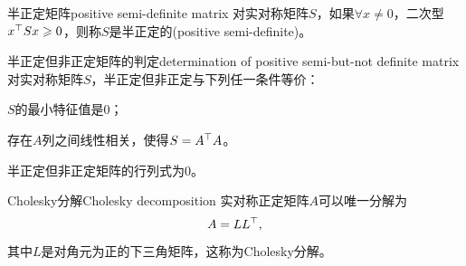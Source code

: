 \begin{definition}{半正定矩阵}{positive semi-definite matrix}
	对实对称矩阵$S$，如果$\forall x \neq 0$，二次型$x^\top Sx \geqslant 0$，则称$S$是半正定的(positive semi-definite)。
\end{definition}
\begin{theorem}{半正定但非正定矩阵的判定}{determination of positive semi-but-not definite matrix}
	对实对称矩阵$S$，半正定但非正定与下列任一条件等价：
	\begin{compactenum}
		\item $S$的最小特征值是0；
		\item 存在$A$列之间线性相关，使得$S = A^\top A$。
	\end{compactenum}
\end{theorem}
\begin{corollary}
	半正定但非正定矩阵的行列式为0。
\end{corollary}

\begin{theorem}
	{Cholesky分解}{Cholesky decomposition}
	实对称正定矩阵$A$可以唯一分解为
	\begin{equation}
		A = LL^\top,
	\end{equation}
	其中$L$是对角元为正的下三角矩阵，这称为Cholesky分解。
\end{theorem}


